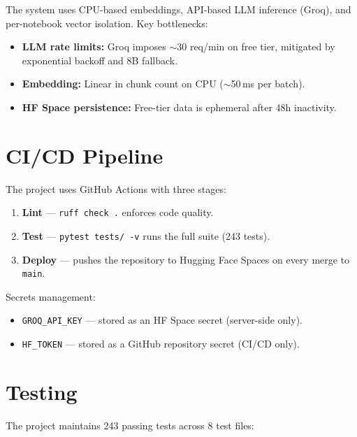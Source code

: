 \documentclass[11pt, letterpaper]{article}
\begin{document}
The system uses CPU-based embeddings, API-based LLM inference (Groq), and
per-notebook vector isolation.  Key bottlenecks:

\begin{itemize}
    \item \textbf{LLM rate limits:} Groq imposes ${\sim}$30 req/min on free tier,
          mitigated by exponential backoff and 8B fallback.
    \item \textbf{Embedding:} Linear in chunk count on CPU (${\sim}$50\,ms per batch).
    \item \textbf{HF Space persistence:} Free-tier data is ephemeral after 48h inactivity.
\end{itemize}

\section{CI/CD Pipeline}

The project uses GitHub Actions with three stages:

\begin{enumerate}
    \item \textbf{Lint} --- \texttt{ruff check .} enforces code quality.
    \item \textbf{Test} --- \texttt{pytest tests/ -v} runs the full suite (243 tests).
    \item \textbf{Deploy} --- pushes the repository to Hugging Face Spaces on every merge to \texttt{main}.
\end{enumerate}

Secrets management:
\begin{itemize}
    \item \texttt{GROQ\_API\_KEY} --- stored as an HF Space secret (server-side only).
    \item \texttt{HF\_TOKEN} --- stored as a GitHub repository secret (CI/CD only).
\end{itemize}

\section{Testing}

The project maintains 243 passing tests across 8 test files:
\end{document}
